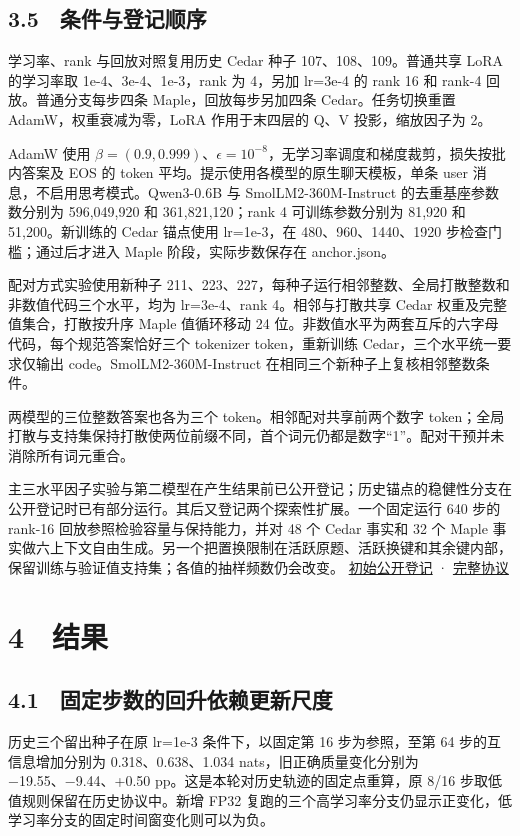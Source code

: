 \documentclass[UTF8,fontset=fandol,10pt,a4paper]{ctexart}
\begin{document}
\subsection*{3.5　条件与登记顺序}
学习率、rank 与回放对照复用历史 Cedar 种子 107、108、109。普通共享 LoRA 的学习率取 1e-4、3e-4、1e-3，rank 为 4，另加 lr=3e-4 的 rank 16 和 rank-4 回放。普通分支每步四条 Maple，回放每步另加四条 Cedar。任务切换重置 AdamW，权重衰减为零，LoRA 作用于末四层的 Q、V 投影，缩放因子为 2。



AdamW 使用 $\beta=(0.9,0.999)$、$\epsilon=10^{-8}$，无学习率调度和梯度裁剪，损失按批内答案及 EOS 的 token 平均。提示使用各模型的原生聊天模板，单条 user 消息，不启用思考模式。Qwen3-0.6B 与 SmolLM2-360M-Instruct 的去重基座参数数分别为 596,049,920 和 361,821,120；rank 4 可训练参数分别为 81,920 和 51,200。新训练的 Cedar 锚点使用 lr=1e-3，在 480、960、1440、1920 步检查门槛；通过后才进入 Maple 阶段，实际步数保存在 anchor.json。



配对方式实验使用新种子 211、223、227，每种子运行相邻整数、全局打散整数和非数值代码三个水平，均为 lr=3e-4、rank 4。相邻与打散共享 Cedar 权重及完整值集合，打散按升序 Maple 值循环移动 24 位。非数值水平为两套互斥的六字母代码，每个规范答案恰好三个 tokenizer token，重新训练 Cedar，三个水平统一要求仅输出 code。SmolLM2-360M-Instruct 在相同三个新种子上复核相邻整数条件。



两模型的三位整数答案也各为三个 token。相邻配对共享前两个数字 token；全局打散与支持集保持打散使两位前缀不同，首个词元仍都是数字“1”。配对干预并未消除所有词元重合。



主三水平因子实验与第二模型在产生结果前已公开登记；历史锚点的稳健性分支在公开登记时已有部分运行。其后又登记两个探索性扩展。一个固定运行 640 步的 rank-16 回放参照检验容量与保持能力，并对 48 个 Cedar 事实和 32 个 Maple 事实做六上下文自由生成。另一个把置换限制在活跃原题、活跃换键和其余键内部，保留训练与验证值支持集；各值的抽样频数仍会改变。 \href{https://github.com/soloduist-pixiv/lora-binding-interference/commit/804bde4}{初始公开登记} · \href{https://github.com/soloduist-pixiv/lora-binding-interference/blob/main/paper/review_protocol.md}{完整协议}



\section*{4　结果}
\subsection*{4.1　固定步数的回升依赖更新尺度}
历史三个留出种子在原 lr=1e-3 条件下，以固定第 16 步为参照，至第 64 步的互信息增加分别为 0.318、0.638、1.034 nats，旧正确质量变化分别为 −19.55、−9.44、+0.50 pp。这是本轮对历史轨迹的固定点重算，原 8/16 步取低值规则保留在历史协议中。新增 FP32 复跑的三个高学习率分支仍显示正变化，低学习率分支的固定时间窗变化则可以为负。
\end{document}

